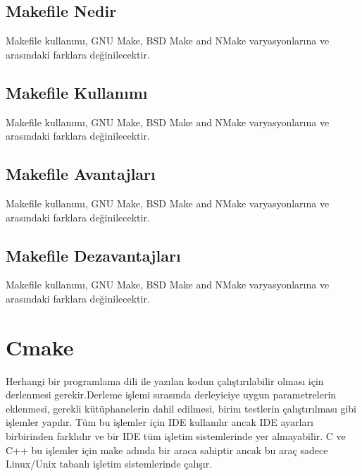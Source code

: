 \documentclass[
]{book}
\begin{document}
\hypertarget{makefile-nedir}{%
\section{Makefile Nedir}\label{makefile-nedir}}

Makefile kullanımı, GNU Make, BSD Make and NMake varyasyonlarına ve arasındaki farklara değinilecektir.

\hypertarget{makefile-kullanux131mux131}{%
\section{Makefile Kullanımı}\label{makefile-kullanux131mux131}}

Makefile kullanımı, GNU Make, BSD Make and NMake varyasyonlarına ve arasındaki farklara değinilecektir.

\hypertarget{makefile-avantajlarux131}{%
\section{Makefile Avantajları}\label{makefile-avantajlarux131}}

Makefile kullanımı, GNU Make, BSD Make and NMake varyasyonlarına ve arasındaki farklara değinilecektir.

\hypertarget{makefile-dezavantajlarux131}{%
\section{Makefile Dezavantajları}\label{makefile-dezavantajlarux131}}

Makefile kullanımı, GNU Make, BSD Make and NMake varyasyonlarına ve arasındaki farklara değinilecektir.

\hypertarget{cmake}{%
\chapter{Cmake}\label{cmake}}

Herhangi bir programlama dili ile yazılan kodun çalıştırılabilir olması için derlenmesi gerekir.Derleme işlemi sırasında derleyiciye uygun parametrelerin eklenmesi, gerekli kütüphanelerin dahil edilmesi, birim testlerin çalıştırılması gibi işlemler yapılır. Tüm bu işlemler için IDE kullanılır ancak IDE ayarları birbirinden farklıdır ve bir IDE tüm işletim sistemlerinde yer almayabilir.
C ve C++ bu işlemler için make adında bir araca sahiptir ancak bu araç sadece Linux/Unix tabanlı işletim sistemlerinde çalışır.
\end{document}
